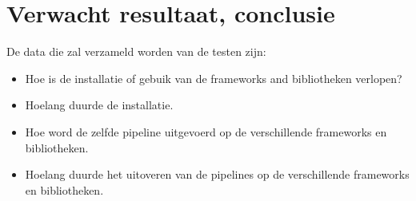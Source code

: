 




\section{Verwacht resultaat, conclusie}%
\label{sec:verwachte_resultaten}

De data die zal verzameld worden van de testen zijn:
\begin{itemize}
  \item Hoe is de installatie of gebuik van de frameworks and bibliotheken verlopen?
  \item Hoelang duurde de installatie.
  \item Hoe word de zelfde pipeline uitgevoerd op de verschillende frameworks en bibliotheken.
  \item Hoelang duurde het uitoveren van de pipelines op de verschillende frameworks en bibliotheken.
\end{itemize}


